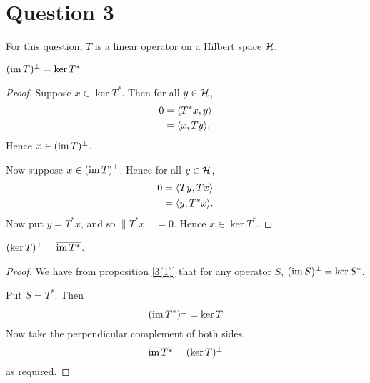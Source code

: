 \documentclass{unswmaths}
\begin{document}
\section*{Question 3}
For this question, $T$ is a linear operator
on a Hilbert space $\mathcal{H}$.
\begin{proposition}
\label{3(1)}
    $(\operatorname{im} T)^\perp = \ker T^*$
\end{proposition}
\begin{proof}
    Suppose $x \in \ker T^*$. Then for all $y \in \mathcal{H}$,
    \begin{align*}
        0 &= \langle T^*x,y\rangle\\
          &= \langle x,Ty\rangle.
    \end{align*}
    Hence $x \in (\operatorname{im} T)^\perp$. 
    
    Now suppose $x \in (\operatorname{im} T)^\perp$. Hence for all
    $y \in \mathcal{H}$, 
    \begin{align*}
        0 &= \langle Ty,Tx\rangle\\
        &= \langle y,T^*x\rangle.
    \end{align*}
    Now put $y = T^*x$, and so $\| T^*x\| = 0$. Hence
    $x \in \ker T^*$.
\end{proof}
\begin{proposition}
    $(\ker T)^\perp = \overline{\operatorname{im} T^*}$.
\end{proposition}
\begin{proof}
    We have from proposition \ref{3(1)} that for
    any operator $S$, $(\operatorname{im} S)^\perp = \ker S^*$.
    
    Put $S = T^*$. Then
    \begin{equation*}
        (\operatorname{im} T^*)^\perp = \ker T
    \end{equation*}
    Now take the perpendicular complement of both
    sides,
    \begin{equation*}
        \overline{\operatorname{im} T^*} = (\ker T)^\perp
    \end{equation*}
    as required.
\end{proof}
\end{document}
